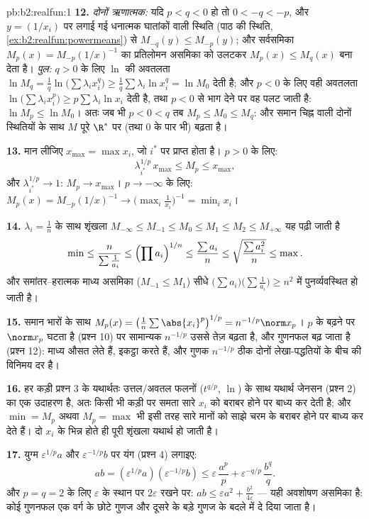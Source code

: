 \begin{solution}{pb:b2:realfun:1}
\textbf{12.} \emph{दोनों ऋणात्मक:} यदि $p < q < 0$ हो तो $0 < -q <
-p$, और $y =
(1/x_i)$ पर लगाई गई
धनात्मक घातांकों वाली स्थिति (पाठ की स्थिति, \cref{ex:b2:realfun:powermeans}) से $M_{-q}(y) \leq M_{-p}(y)$; और सर्वसमिका
$M_p(x) = M_{-p}(1/x)^{-1}$ का प्रतिलोमन असमिका को उलटकर $M_p(x) \leq M_q(x)$ बना देता है। \emph{पुल:} $q > 0$ के लिए
$\ln$ की अवतलता $\ln M_q =
\frac1q\ln\bigl(\sum\lambda_ix_i^q\bigr) \geq
\frac1q\sum\lambda_i\ln x_i^q = \ln M_0$ देती है; और $p < 0$ के लिए वही अवतलता $\ln\bigl(\sum\lambda_ix_i^p\bigr) \geq
p\sum\lambda_i\ln x_i$ देती है, तथा
$p < 0$ से भाग देने पर वह पलट जाती है: $\ln M_p
\leq \ln M_0$। अतः जब भी $p < 0 <
q$ तब $M_p \leq M_0 \leq M_q$: और
समान चिह्न वाली दोनों स्थितियों के साथ $M$ पूरे $\R^*$ पर (तथा $0$ के
पार भी) बढ़ता है।

\textbf{13.} मान लीजिए $x_{\max} = \max x_i$, जो $i^*$ पर प्राप्त होता है। $p > 0$ के लिए:
\[
\lambda_{i^*}^{1/p}\,x_{\max} \leq M_p \leq x_{\max},
\]
और $\lambda_{i^*}^{1/p} \to 1$: $M_p \to x_{\max}$। $p \to
-\infty$ के लिए: $M_p(x) = M_{-p}(1/x)^{-1} \to
\bigl(\max_i\frac1{x_i}\bigr)^{-1} = \min_ix_i$।

\textbf{14.} $\lambda_i = \frac1n$ के साथ शृंखला $M_{-\infty}
\leq M_{-1} \leq M_0 \leq M_1 \leq M_2 \leq M_{+\infty}$ यह पढ़ी जाती है
\[
\min \leq \frac{n}{\sum\frac1{a_i}} \leq \Bigl(\prod
a_i\Bigr)^{1/n} \leq \frac{\sum a_i}{n} \leq
\sqrt{\frac{\sum a_i^2}{n}} \leq \max .
\]
और समांतर--हरात्मक माध्य असमिका ($M_{-1} \leq M_1$) सीधे $\bigl(\sum a_i\bigr)\bigl(\sum\frac1{a_i}\bigr) \geq n^2$ में पुनर्व्यवस्थित हो
जाती है।

\textbf{15.} समान भारों के साथ $M_p(x) =
\bigl(\frac1n\sum\abs{x_i}^p\bigr)^{1/p} = n^{-1/p}\norm x_p$। $p$ के बढ़ने पर $\norm x_p$ घटता है (प्रश्न
10) पर सामान्यक $n^{-1/p}$ उससे तेज़ बढ़ता है, और गुणनफल बढ़ जाता है (प्रश्न
12): माध्य औसत लेते हैं,  इकट्ठा करते हैं, और गुणक $n^{-1/p}$ ठीक दोनों
लेखा-पद्धतियों के बीच की विनिमय दर है।

\textbf{16.} हर कड़ी प्रश्न 3 के यथार्थतः उत्तल/अवतल फलनों ($t^{q/p}$, $\ln$) के
साथ यथार्थ जेनसन (प्रश्न 2) का एक उदाहरण है, अतः किसी भी कड़ी पर समता
सारे $x_i$ को बराबर होने पर बाध्य कर देती है; और $\min = M_p$ अथवा $M_p = \max$ भी इसी तरह
सारे मानों को साझे चरम के बराबर होने पर बाध्य कर देते हैं। दो $x_i$ के
भिन्न होते ही पूरी शृंखला यथार्थ हो जाती है।

\textbf{17.} युग्म $\varepsilon^{1/p}a$ और $\varepsilon^{-1/p}b$ पर यंग (प्रश्न 4) लगाइए:
\[
ab = (\varepsilon^{1/p}a)(\varepsilon^{-1/p}b)
\leq \varepsilon\,\frac{a^p}p +
\varepsilon^{-q/p}\,\frac{b^q}q .
\]
और $p = q = 2$ के लिए $\varepsilon$ के स्थान पर $2\varepsilon$ रखने पर: $ab \leq \varepsilon a^2 + \frac{b^2}{4\varepsilon}$ --- यही अवशोषण असमिका है:
कोई गुणनफल एक वर्ग के छोटे गुणज और दूसरे के बड़े गुणज के बदले में दे दिया
जाता है।


\end{solution}
